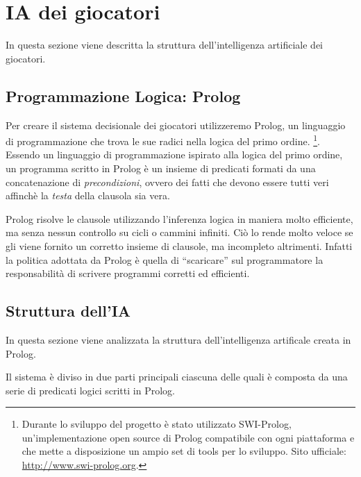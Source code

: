 
\section*{IA dei giocatori}
%
\label{sec:ai_giocatori}
In questa sezione viene descritta la struttura dell'intelligenza artificiale dei giocatori.

\subsection{Programmazione Logica: Prolog}
Per creare il sistema decisionale dei giocatori utilizzeremo Prolog, un linguaggio di programmazione che trova le sue radici nella logica del primo ordine.
\footnote{Durante lo sviluppo del progetto \`{e} stato utilizzato SWI-Prolog, un'implementazione open source di Prolog compatibile con ogni piattaforma e che mette a disposizione un ampio set di tools per lo sviluppo. Sito ufficiale: \href{http://www.swi-prolog.org/}{http://www.swi-prolog.org}.}.
Essendo un linguaggio di programmazione ispirato alla logica del primo ordine, un programma scritto in Prolog \`{e} un insieme di predicati formati da una concatenazione di \emph{precondizioni}, ovvero dei fatti che devono essere tutti veri affinch\`{e} la \emph{testa} della clausola sia vera.

Prolog risolve le clausole utilizzando l'inferenza logica in maniera molto efficiente, ma senza nessun controllo su cicli o cammini infiniti. Ci\`{o} lo rende molto veloce se gli viene fornito un corretto insieme di clausole, ma incompleto altrimenti. Infatti la politica adottata da Prolog \`{e} quella di ``scaricare'' sul programmatore la responsabilit\`{a} di scrivere programmi corretti ed efficienti.\\

\subsection{Struttura dell'IA}
\label{sec:struct_ia}
In questa sezione viene analizzata la struttura dell'intelligenza artificale creata in Prolog.

Il sistema \`{e} diviso in due parti principali ciascuna delle quali \`{e} composta da una serie di predicati logici scritti in Prolog.

